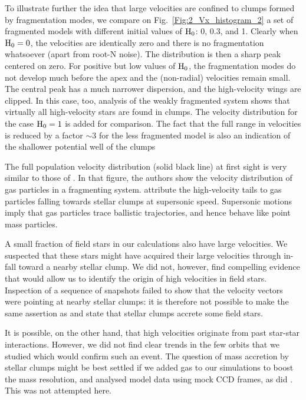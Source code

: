 To illustrate further the idea that large velocities are confined to clumps formed by fragmentation modes, we compare on Fig.~\ref{Fig:2_Vx_histogram_2} a set of fragmented models 
with different initial  values of  ${\textrm{H}}_0$: 0, 0.3, and 1. 
Clearly when ${\textrm{H}}_0=0$, the velocities are identically zero and there is no fragmentation whatsoever (apart from root-N noise). The distribution is then a sharp peak centered on zero. For positive but low values of ${\textrm{H}}_0$, the fragmentation modes do not develop much before the apex and the (non-radial) velocities remain small. The central peak  has a much narrower dispersion, and the high-velocity wings are clipped. In this case, too, analysis of the  weakly fragmented system shows that virtually all high-velocity stars are found in clumps. The velocity distribution for the case  ${\textrm{H}}_0 = 1$ is added for comparison. The fact that the full range in velocities is reduced by a factor $\sim 3$ for the 
less fragmented model is also an indication of the shallower potential well of the clumps

The full population velocity distribution (solid black line) at first sight is very similar to those of \citet[Fig.~5]{Klessen2000}. In that figure, the authors show the velocity distribution of gas particles in a fragmenting system. \citeauthor{Klessen2000} attribute the high-velocity tails to gas particles falling towards stellar clumps at supersonic speed. Supersonic motions imply that gas particles trace ballistic trajectories, and hence behave like point mass particles. 

A small fraction of field stars in our calculations also have large velocities. We suspected that these stars might have acquired their large velocities through in-fall toward a nearby stellar clump. We did not, however,  find compelling evidence that would allow us to identify the origin of high velocities in field stars. Inspection of a sequence of snapshots failed to show that the velocity vectors were pointing at nearby stellar clumps: it is therefore not possible to make the same assertion as \citeauthor{Klessen2000} and state that stellar clumps accrete some field stars.

It is possible, on the other hand,  that high velocities originate from past star-star interactions. However, we did not find clear trends in the few orbits that we studied which would confirm such an event. The question of mass accretion by stellar clumps might be best settled if we added gas to our simulations to boost the mass resolution, and analysed model data using mock CCD frames, as did \citeauthor{Klessen2000}. This was not attempted here.

